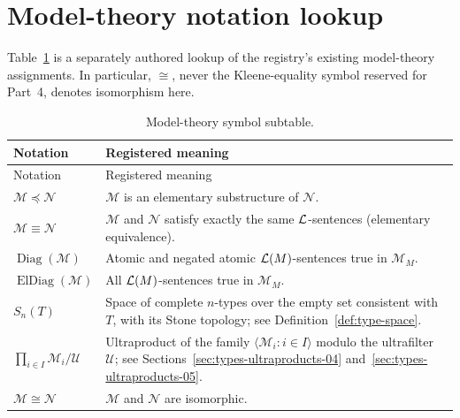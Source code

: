 \section{Model-theory notation lookup}
\label{sec:p03-model-symbols}

Table~\ref{tab:p03-model-symbols} is a separately authored lookup of the
registry's existing model-theory assignments.  In particular,
\(\cong\), never the Kleene-equality symbol reserved for Part~4, denotes
isomorphism here.

\begingroup\small
\begin{longtable}{@{}p{}p{}@{}}
\caption{Model-theory symbol subtable.}
\label{tab:p03-model-symbols}\\
\toprule
Notation & Registered meaning \\
\midrule
\endfirsthead
\toprule
Notation & Registered meaning \\
\midrule
\endhead
\(\mathcal M\preccurlyeq\mathcal N\) &
  \(\mathcal M\) is an elementary substructure of \(\mathcal N\). \\
\addlinespace
\(\mathcal M\equiv\mathcal N\) &
  \(\mathcal M\) and \(\mathcal N\) satisfy exactly the same
  \(\mathcal{L}\)-sentences (elementary equivalence). \\
\addlinespace
\(\operatorname{Diag}(\mathcal M)\) &
  Atomic and negated atomic \(\mathcal{L}(M)\)-sentences true in \(\mathcal M_M\). \\
\addlinespace
\(\operatorname{ElDiag}(\mathcal M)\) &
  All \(\mathcal{L}(M)\)-sentences true in \(\mathcal M_M\). \\
\addlinespace
\(S_n(T)\) &
  Space of complete \(n\)-types over the empty set consistent with \(T\), with
  its Stone topology; see Definition~\ref{def:type-space}. \\
\addlinespace
\(\displaystyle\prod_{i\in I}\mathcal M_i/\mathcal U\) &
  Ultraproduct of the family \(\langle\mathcal M_i:i\in I\rangle\) modulo
  the ultrafilter \(\mathcal U\); see
  Sections~\ref{sec:types-ultraproducts-04}
  and~\ref{sec:types-ultraproducts-05}. \\
\addlinespace
\(\mathcal M\cong\mathcal N\) &
  \(\mathcal M\) and \(\mathcal N\) are isomorphic. \\
\bottomrule
\end{longtable}
\endgroup
